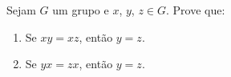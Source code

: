 \documentclass[12pt]{exam}
\begin{document}

\vspace{.3cm}

\questao{} Sejam $G$ um grupo e $x$, $y$, $z \in G$. Prove que:
\begin{enumerate}[label=({\alph*})]
	\item Se $xy = xz$, ent\~ao $y = z$.
	\item Se $yx = zx$, ent\~ao $y = z$.
\end{enumerate}

\vspace{.3cm}

\end{document}
